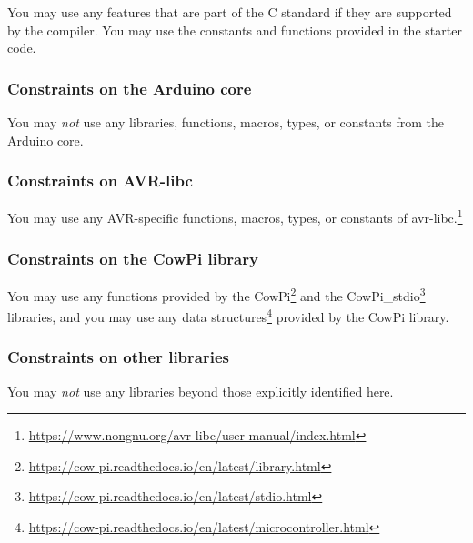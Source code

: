 You may use any features that are part of the C standard if they are supported by the compiler.
You may use the constants and functions provided in the starter code.

\subsubsection{Constraints on the Arduino core}

You may \textit{not} use any libraries, functions, macros, types, or constants from the Arduino core.

\subsubsection{Constraints on AVR-libc}

You may use any AVR-specific functions, macros, types, or constants of avr-libc.\footnote{
    \url{https://www.nongnu.org/avr-libc/user-manual/index.html}
}

\subsubsection{Constraints on the CowPi library}

You may use any functions provided by the CowPi\footnote{
    \url{https://cow-pi.readthedocs.io/en/latest/library.html}
}
and the CowPi\_stdio\footnote{
    \url{https://cow-pi.readthedocs.io/en/latest/stdio.html}
} libraries,
and you may use any data structures\footnote{
    \url{https://cow-pi.readthedocs.io/en/latest/microcontroller.html}
} provided by the CowPi library.

\subsubsection{Constraints on other libraries}

You may \textit{not} use any libraries beyond those explicitly identified here.
